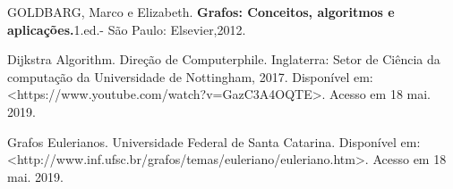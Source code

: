 \documentclass[a4paper, 12pt]{article}
\begin{document}
\medskip GOLDBARG, Marco e Elizabeth. \textbf{Grafos: Conceitos, algoritmos e aplicações.}1.ed.- São Paulo: Elsevier,2012.

\medskip Dijkstra Algorithm. Direção de Computerphile. Inglaterra: Setor de Ciência da computação da Universidade de Nottingham, 2017. Disponível em: \\<https://www.youtube.com/watch?v=GazC3A4OQTE>. Acesso em 18 mai. 2019.


\medskip Grafos Eulerianos. Universidade Federal de Santa Catarina. Disponível em:\\ <http://www.inf.ufsc.br/grafos/temas/euleriano/euleriano.htm>. Acesso em 18 mai. 2019. 
\end{document}
